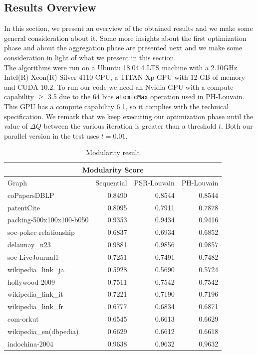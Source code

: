 \subsection{Results Overview}
In this section, we present an overview of the obtained results and we make some general consideration about it. Some more insights about the first optimization phase and about the aggregation phase are presented next and we make some consideration in light of what we present in this section.\\ 
The algorithms were run on a Ubuntu 18.04.4 LTS machine with a 2.10GHz  Intel(R) Xeon(R) Silver 4110 CPU, a TITAN Xp GPU with 12 GB of memory and CUDA 10.2. To run our code we need an Nvidia GPU with a compute capability $\geq$ 3.5 due to the 64 bits \verb|atomicMax| operation used in PH-Louvain. This GPU has a compute capability 6.1, so it complies with the technical specification.
We remark that we keep executing our optimization phase until the value of $\Delta Q$ between the various iteration is greater than a threshold $t$. Both our parallel version in the test uses $t = 0.01$.\\
\begin{table}[h]
	\centering
	\begin{tabular}{ |l||r||r|r|}
		\hline
		\multicolumn{4}{|c|}{Modularity Score} \\
		\hline
		Graph & Sequential & PSR-Louvain & PH-Louvain \\
		\hline
		coPapersDBLP 			& 0.8490 & 0.8544 & 0.8544 \\
		patentCite 				& 0.8095 & 0.7911 & 0.7878 \\
		packing-500x100x100-b050& 0.9353 & 0.9434 & 0.9416 \\
		soc-pokec-relationship	& 0.6837 & 0.6934 & 0.6852 \\ 
		delaunay\_n23 			& 0.9881 & 0.9856 & 0.9857 \\
		soc-LiveJournal1 		& 0.7251 & 0.7491 & 0.7482 \\
		wikipedia\_link\_ja 	& 0.5928 & 0.5690 & 0.5724 \\
		hollywood-2009 			& 0.7511 & 0.7542 & 0.7542 \\
		wikipedia\_link\_it 	& 0.7221 & 0.7190 & 0.7196 \\
		wikipedia\_link\_fr 	& 0.6777 & 0.6834 & 0.6871 \\
		com-orkut 				& 0.6545 & 0.6613 & 0.6629 \\
		wikipedia\_en(dbpedia) 	& 0.6629 & 0.6612 & 0.6618 \\
		indochina-2004 			& 0.9638 & 0.9632 & 0.9632 \\
		\hline
	\end{tabular}
	\caption{\label{tab:mod}Modularity result}
\end{table} \\
